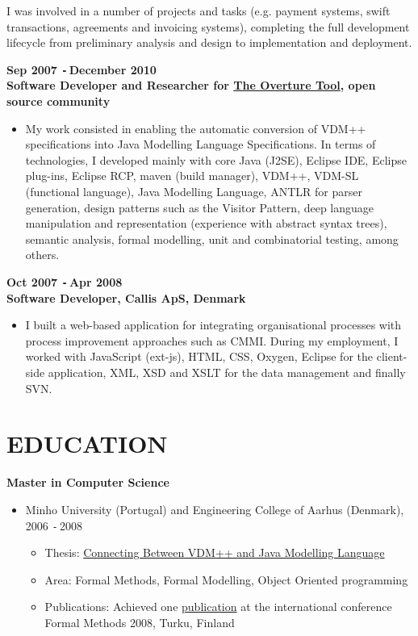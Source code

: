 \documentclass{res}
\def\Minus{\texttt{-}\,}
\begin{document}
\begin{resume}
\begin{itemize}
        I was involved in a number of projects and tasks (e.g. payment systems, swift transactions, agreements and invoicing systems), completing the full development lifecycle from preliminary analysis and design to implementation and deployment.
       \end{itemize}

  {\bf Sep 2007 \Minus December 2010}\\
  {\bf Software Developer and Researcher for \href{http://www.overturetool.org}{The Overture Tool}, open source community}
        \begin{itemize}
        \item[] My work consisted in enabling the automatic conversion of VDM++ specifications into Java Modelling Language Specifications. In terms of technologies, I developed mainly with core Java (J2SE), Eclipse IDE, Eclipse plug-ins, Eclipse RCP, maven (build manager), VDM++, VDM-SL (functional language), Java Modelling Language, ANTLR for parser generation, design patterns such as the Visitor Pattern, deep language manipulation and representation (experience with abstract syntax trees), semantic analysis, formal modelling, unit and combinatorial testing, among others.
       \end{itemize}

  {\bf Oct 2007 \Minus Apr 2008}\\
  {\bf Software Developer, Callis ApS, Denmark}
        \begin{itemize}
        \item[] I built a web-based application for integrating organisational processes with process improvement approaches such as CMMI.
During my employment, I worked with JavaScript (ext-js), HTML, CSS, Oxygen, Eclipse for the client-side application, XML, XSD and XSLT for the data management and finally SVN.
        \end{itemize}

\section{EDUCATION}
\vspace{0.1in}

    {\bf Master in Computer Science}
    \begin{itemize}
      \item[] Minho University (Portugal) and Engineering College of Aarhus (Denmark), 2006 \Minus 2008
      \begin{itemize}
        \item Thesis: \href{http://wiki.overturetool.org/images/4/44/ConnectingVDMppJML.pdf}{Connecting Between VDM++ and Java Modelling Language}
        \item Area: Formal Methods, Formal Modelling, Object Oriented programming
        \item Publications: Achieved one \href{http://www.cs.ncl.ac.uk/publications/trs/papers/1099.pdf}{publication} at the international conference Formal Methods 2008, Turku, Finland
      \end{itemize}
    \end{itemize}


\end{resume}
\end{document}
